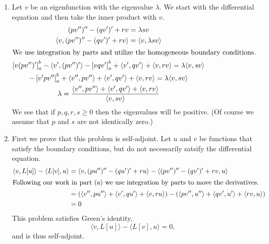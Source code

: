 {%
\begin{Solution}
  \label{solution pv''''-qv''+rv=lsv}
  \begin{enumerate}
  \item
    Let $v$ be an eigenfunction with the eigenvalue $\lambda$.
    We start with the differential equation and then take the inner product 
    with $v$.
    \begin{gather*}
      (p v'')'' - (q v')' + r v = \lambda s v \\
      \langle v, (p v'')'' - (q v')' + r v \rangle = \langle v, \lambda s v \rangle \\
      \intertext{We use integration by parts and utilize the homogeneous 
        boundary conditions.}
      \left[ v (p v'')' \right]_a^b - \langle v', (p v'')' \rangle
      - \left[ v q v' \right]_a^b + \langle v', q v' \rangle
      + \langle v, r v \rangle = \lambda \langle v, s v \rangle \\
      - \left[ v' p v'' \right]_a^b + \langle v'', p v'' \rangle + \langle v', q v' \rangle
      + \langle v, r v \rangle = \lambda \langle v, s v \rangle \\
      \lambda = \frac{ \langle v'', p v'' \rangle + \langle v', q v' \rangle + \langle v, r v \rangle }
      { \langle v, s v \rangle }
    \end{gather*}
    We see that if $p,q,r,s \geq 0$ then the eigenvalues will be positive.
    (Of course we assume that $p$ and $s$ are not identically zero.)
  \item
    First we prove that this problem is self-adjoint.  Let $u$ and $v$ be functions
    that satisfy the boundary conditions, but do not necessarily satsify 
    the differential equation.
    \begin{align*}
      \langle v, L[u] \rangle - \langle L[v], u \rangle
      &= \langle v, (p u'')'' - (q u')' + r u \rangle
      - \langle (p v'')'' - (q v')' + r v, u \rangle \\
      \intertext{Following our work in part (a) we use integration by parts to 
        move the derivatives.}
      &= \left( \langle v'', p u'' \rangle + \langle v', q u' \rangle 
        + \langle v, r u \rangle \right)
      - \left( \langle p v'', u'' \rangle + \langle q v', u' \rangle 
        + \langle r v, u \rangle \right) \\
      &= 0
    \end{align*}
    This problem satisfies Green's identity,
    \[
    \langle v, L[u] \rangle - \langle L[v], u \rangle = 0,
    \]
    and is thus self-adjoint.


\end{enumerate}
\end{Solution}}
